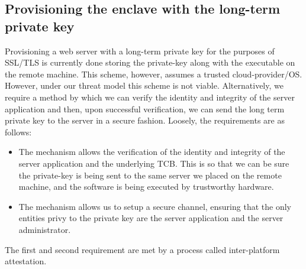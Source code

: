 \documentclass[../main.tex]{subfiles}
\begin{document}
\subsection{Provisioning the enclave with the long-term private key}
Provisioning a web server with a long-term private key for the purposes of SSL/TLS is currently done storing the private-key along with the executable on 
the remote machine. This scheme, however, assumes a trusted cloud-provider/OS. However, under our threat model this scheme is not viable. Alternatively,
we require a method by which we can verify the identity and integrity of the server application and then, upon successful verification, we can 
send the long term private key to the server in a secure fashion. Loosely, the requirements are as follows:
\begin{itemize}
	\item The mechanism allows the verification of the identity and integrity of the server application and the underlying TCB.
	      This is so that we can be sure the private-key is being sent to the same server we placed on the remote machine, and the software is being executed by
	      trustworthy hardware.
	\item The mechanism allows us to setup a secure channel, ensuring that the only entities privy to the private key 
	      are the server application and the server administrator.
\end{itemize} 
The first and second requirement are met by a process called inter-platform attestation.
\end{document}
